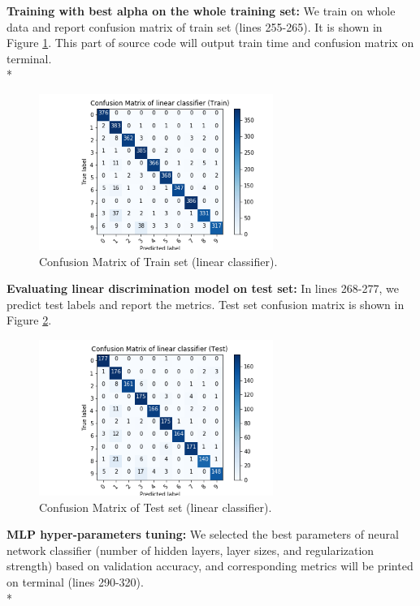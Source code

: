 \documentclass[12pt]{article}
\begin{document}
\textbf{Training with best alpha on the whole training set:} We train on whole data and report confusion matrix of train set (lines 255-265). It is shown in Figure \ref{fig:sgdtrain}. This part of source code will output train time and confusion matrix on terminal.\\*
\begin{figure}[ht] 
	\begin{center}
		\includegraphics[width=3in]{sgdtrain.png}
		\caption{Confusion Matrix of Train set (linear classifier).}
		\label{fig:sgdtrain}
	\end{center}
\end{figure} 
\textbf{Evaluating linear discrimination model on test set:} In lines 268-277, we predict test labels and report the metrics. Test set confusion matrix is shown in Figure \ref{fig:sgdtest}.
\begin{figure}[ht] 
	\begin{center}
		\includegraphics[width=3in]{sgdtest.png}
		\caption{Confusion Matrix of Test set (linear classifier).}
		\label{fig:sgdtest}
	\end{center}
\end{figure} 
\newpage
\textbf{MLP hyper-parameters tuning:} We selected the best parameters of neural network classifier (number of hidden layers, layer sizes, and regularization strength) based on validation accuracy, and corresponding metrics will be printed on terminal (lines 290-320).\\*
\end{document}
